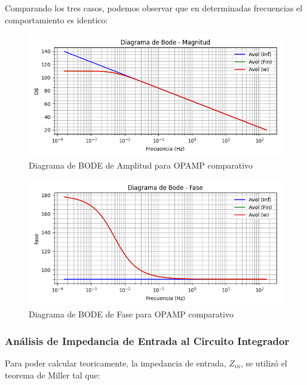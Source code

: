 Comparando los tres casos, podemos observar que en determinadas frecuencias el comportamiento es identico:

\begin{figure}[H]
    \centering 
    \includegraphics [scale=1] {../Ejercicio3-CircuitoIntegradoresyDerivadores/Imagenes/comparativo-magnitud.png} 
    \caption{Diagrama de BODE de Amplitud para OPAMP comparativo }
    \label{fig:emptyPlotTool}
\end{figure}

\begin{figure}[H]
    \centering 
    \includegraphics [scale=1] {../Ejercicio3-CircuitoIntegradoresyDerivadores/Imagenes/comparativo-fase.png} 
    \caption{Diagrama de BODE de Fase para OPAMP comparativo }
    \label{fig:emptyPlotTool}
\end{figure}

\subsubsection{Análisis de Impedancia de Entrada al Circuito Integrador}

Para poder calcular teoricamente, la impedancia de entrada, $Z_{in}$, se utilizó el teorema de Miller tal que:

